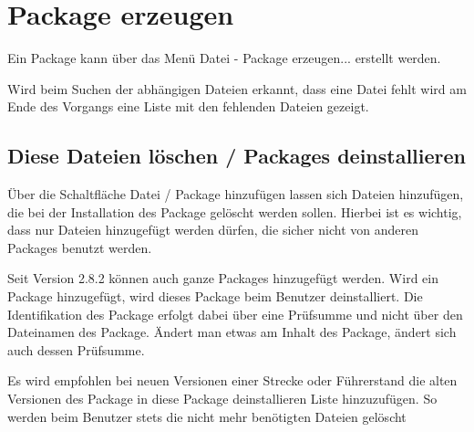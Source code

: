 \section{Package erzeugen}
\label{sec:editor.allg.packages}

Ein Package kann über das Menü Datei - Package erzeugen... erstellt werden.

Wird beim Suchen der abhängigen Dateien erkannt, dass eine Datei fehlt wird am Ende des Vorgangs eine Liste mit den fehlenden Dateien gezeigt.

\subsection{Diese Dateien löschen / Packages deinstallieren}

Über die Schaltfläche Datei / Package hinzufügen lassen sich Dateien
hinzufügen, die bei der Installation des Package gelöscht werden sollen.
Hierbei ist es wichtig, dass nur Dateien hinzugefügt werden dürfen, die
sicher nicht von anderen Packages benutzt werden.

Seit Version 2.8.2 können auch ganze Packages hinzugefügt werden. Wird
ein Package hinzugefügt, wird dieses Package beim Benutzer
deinstalliert. Die Identifikation des Package erfolgt dabei über eine
Prüfsumme und nicht über den Dateinamen des Package. Ändert man etwas am
Inhalt des Package, ändert sich auch dessen Prüfsumme.

Es wird empfohlen bei neuen Versionen einer Strecke oder Führerstand die
alten Versionen des Package in diese Package deinstallieren Liste
hinzuzufügen. So werden beim Benutzer stets die nicht mehr benötigten
Dateien gelöscht
